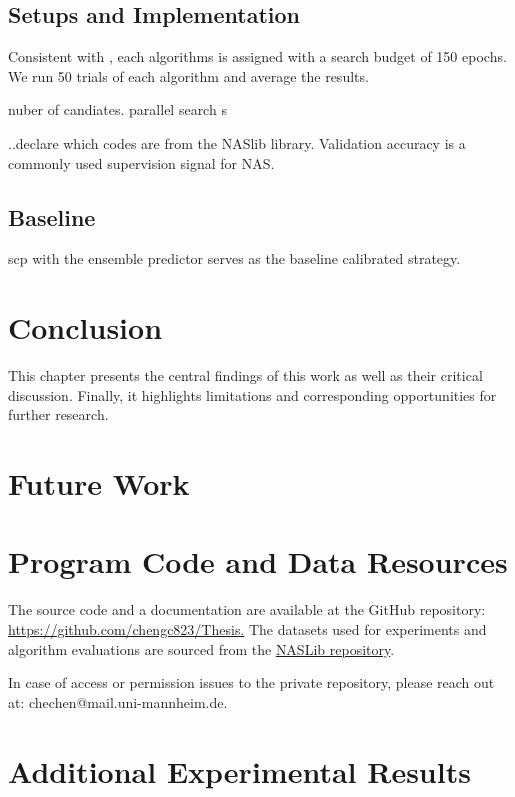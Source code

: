 \documentclass[a4paper,oneside,bibliography=totoc]{scrbook}
\begin{document}
\section{Setups and Implementation}

Consistent with \cite{white2019bananas}, each algorithms is assigned with a search budget of 150 epochs. We run 50 trials of each algorithm and average the results.


 nuber of candiates. parallel search s

..declare which codes are from the NASlib library.
Validation accuracy is a commonly used supervision signal for NAS.
\section{Baseline}
\gls{scp} with the ensemble predictor serves as the baseline calibrated strategy. 


\chapter{Conclusion}
\label{Conclude}
This chapter presents the central findings of this work as well as their critical discussion. Finally, it highlights limitations and corresponding opportunities for further research.

\chapter{Future Work}




\listofalgorithms 
\listoffigures 
\listoftables
\printglossary[type=\acronymtype, title=Acronyms]

\appendix
\chapter{Program Code and Data Resources}
The source code and a documentation are available at the GitHub repository: \url{https://github.com/chengc823/Thesis.}
The datasets used for experiments and algorithm evaluations are sourced from the \href{https://github.com/automl/NASLib/tree/Develop}{NASLib repository}.

In case of access or permission issues to the private repository, please reach out at: chechen@mail.uni-mannheim.de.

\chapter{Additional Experimental Results}
\end{document}
